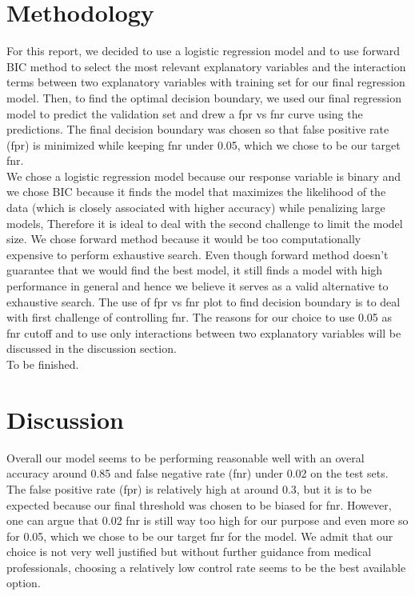 \documentclass{article}
\begin{document}
\section{Methodology}
For this report, we decided to use a logistic regression model and to use forward BIC method to select the most relevant explanatory variables and the interaction terms between two explanatory variables with training set for our final regression model. Then, to find the optimal decision boundary, we used our final regression model to predict the validation set and drew a fpr vs fnr curve using the predictions. The final decision boundary was chosen so that false positive rate (fpr) is minimized while keeping fnr under 0.05, which we chose to be our target fnr.\\

We chose a logistic regression model because our response variable is binary and we chose BIC because it finds the model that maximizes the likelihood of the data (which is closely associated with higher accuracy) while penalizing large models, Therefore it is ideal to deal with the second challenge to limit the model size. We chose forward method because it would be too computationally expensive to perform exhaustive search. Even though forward method doesn't guarantee that we would find the best model, it still finds a model with high performance in general and hence we believe it serves as a valid alternative to exhaustive search. The use of fpr vs fnr plot to find decision boundary is to deal with first challenge of controlling fnr. The reasons for our choice to use 0.05 as fnr cutoff and to use only interactions between two explanatory variables will be discussed in the discussion section.\\

To be finished.\\


\section{Discussion}
Overall our model seems to be performing reasonable well with an overal accuracy around 0.85 and false negative rate (fnr) under 0.02 on the test sets. The false positive rate (fpr) is relatively high at around 0.3, but it is to be expected because our final threshold was chosen to be biased for fnr. However, one can argue that 0.02 fnr is still way too high for our purpose and even more so for 0.05, which we chose to be our target fnr for the model. We admit that our choice is not very well justified but without further guidance from medical professionals, choosing a relatively low control rate seems to be the best available option.\\
\end{document}
